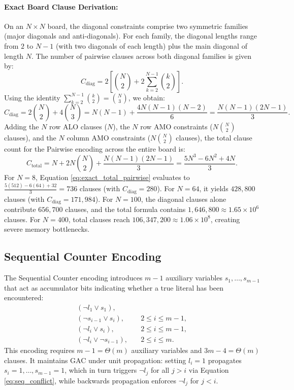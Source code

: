 \documentclass[a4paper,fleqn]{cas-sc}
\begin{document}
\paragraph{Exact Board Clause Derivation:}
On an $N \times N$ board, the diagonal constraints comprise two symmetric families (major diagonals and anti-diagonals). For each family, the diagonal lengths range from $2$ to $N-1$ (with two diagonals of each length) plus the main diagonal of length $N$. The number of pairwise clauses across both diagonal families is given by:
\begin{equation}
    C_{\text{diag}} = 2 \left[ \binom{N}{2} + 2 \sum_{k=2}^{N-1} \binom{k}{2} \right].
\end{equation}
Using the identity $\sum_{k=2}^{N-1} \binom{k}{2} = \binom{N}{3}$, we obtain:
\begin{equation}
    C_{\text{diag}} = 2 \binom{N}{2} + 4 \binom{N}{3} = N(N-1) + \frac{4 N(N-1)(N-2)}{6} = \frac{N(N-1)(2N-1)}{3}. \label{eq:exact_diag_clauses}
\end{equation}
Adding the $N$ row ALO clauses ($N$), the $N$ row AMO constraints ($N \binom{N}{2}$ clauses), and the $N$ column AMO constraints ($N \binom{N}{2}$ clauses), the total clause count for the Pairwise encoding across the entire board is:
\begin{equation}
    C_{\text{total}} = N + 2N \binom{N}{2} + \frac{N(N-1)(2N-1)}{3} = \frac{5N^3 - 6N^2 + 4N}{3}. \label{eq:exact_total_pairwise}
\end{equation}
For $N = 8$, Equation \eqref{eq:exact_total_pairwise} evaluates to $\frac{5(512) - 6(64) + 32}{3} = 736$ clauses (with $C_{\text{diag}} = 280$). For $N = 64$, it yields $428,800$ clauses (with $C_{\text{diag}} = 171,984$). For $N = 100$, the diagonal clauses alone contribute $656,700$ clauses, and the total formula contains $1,646,800 \approx 1.65 \times 10^6$ clauses. For $N = 400$, total clauses reach $106,347,200 \approx 1.06 \times 10^8$, creating severe memory bottlenecks.

\subsection{Sequential Counter Encoding}
The Sequential Counter encoding \citep{sinz2005towards} introduces $m-1$ auxiliary variables $s_1, \dots, s_{m-1}$ that act as accumulator bits indicating whether a true literal has been encountered:
\begin{align}
    (\neg l_1 \lor s_1), & \label{eq:seq_init} \\
    (\neg s_{i-1} \lor s_i), & \quad 2 \le i \le m-1, \label{eq:seq_prop} \\
    (\neg l_i \lor s_i), & \quad 2 \le i \le m-1, \label{eq:seq_set} \\
    (\neg l_i \lor \neg s_{i-1}), & \quad 2 \le i \le m. \label{eq:seq_conflict}
\end{align}
This encoding requires $m-1 = \Theta(m)$ auxiliary variables and $3m - 4 = \Theta(m)$ clauses. It maintains GAC under unit propagation: setting $l_i = 1$ propagates $s_i = 1, \dots, s_{m-1} = 1$, which in turn triggers $\neg l_j$ for all $j > i$ via Equation \eqref{eq:seq_conflict}, while backwards propagation enforces $\neg l_j$ for $j < i$.
\end{document}
